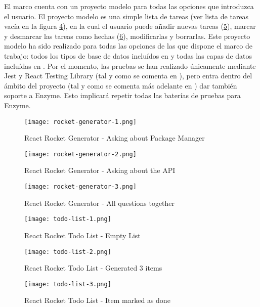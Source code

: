 El marco cuenta con un proyecto modelo para todas las opciones que introduzca el usuario. El proyecto modelo es una simple lista de tareas (ver lista de tareas vacía en la figura \cref{fig:todo-list-1}), en la cual el usuario puede añadir nuevas tareas (\cref{fig:todo-list-2}), marcar y desmarcar las tareas como hechas (\cref{fig:todo-list-3}), modificarlas y borrarlas. Este proyecto modelo ha sido realizado para todas las opciones de las que dispone el marco de trabajo: todos los tipos de base de datos incluídos en  y todas las capas de datos incluídas en . Por el momento, las pruebas se han realizado únicamente mediante Jest y React Testing Library (tal y como se comenta en ), pero entra dentro del ámbito del proyecto (tal y como se comenta más adelante en ) dar también soporte a Enzyme. Esto implicará repetir todas las baterías de pruebas para Enzyme.

\begin{figure}
  \centering
  \texttt{[image: rocket-generator-1.png]}
  \caption{React Rocket Generator - Asking about Package Manager}
  \label{fig:rocket-generator-1}
\end{figure}

\begin{figure}
  \centering
  \texttt{[image: rocket-generator-2.png]}
  \caption{React Rocket Generator - Asking about the API}
  \label{fig:rocket-generator-2}
\end{figure}

\begin{figure}
  \centering
  \texttt{[image: rocket-generator-3.png]}
  \caption{React Rocket Generator - All questions together}
  \label{fig:rocket-generator-3}
\end{figure}

\begin{figure}
  \centering
  \texttt{[image: todo-list-1.png]}
  \caption{React Rocket Todo List - Empty List}
  \label{fig:todo-list-1}
\end{figure}

\begin{figure}
  \centering
  \texttt{[image: todo-list-2.png]}
  \caption{React Rocket Todo List - Generated 3 items}
  \label{fig:todo-list-2}
\end{figure}

\begin{figure}
  \centering
  \texttt{[image: todo-list-3.png]}
  \caption{React Rocket Todo List - Item marked as done}
  \label{fig:todo-list-3}
\end{figure}
